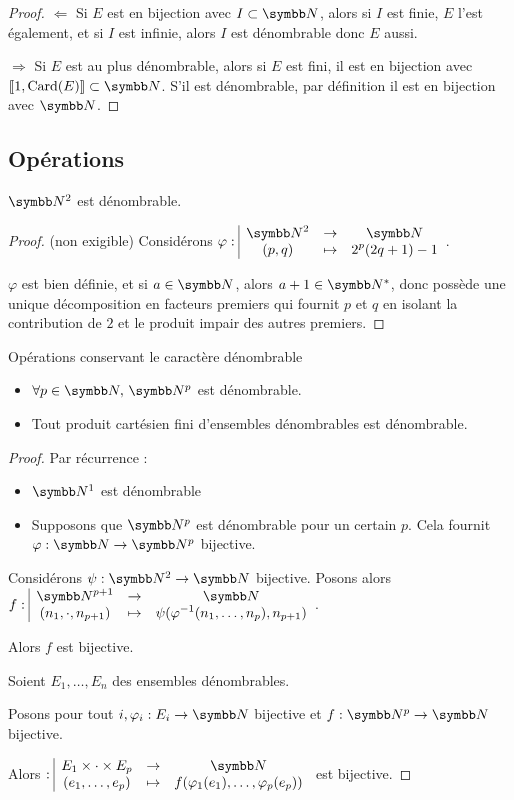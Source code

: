 \begin{proof}
    $\Leftarrow$ Si $E$ est en bijection avec $I \subset \N$, alors si $I$ est finie, 
    $E$ l'est également, et si $I$ est infinie, alors $I$ est dénombrable donc $E$ aussi.

    $\Rightarrow$ Si $E$ est au plus dénombrable, alors si $E$ est fini, il est en bijection 
    avec $\ninter 1 {\text{Card}(E)} \subset \N$.
    S'il est dénombrable, par définition il est en bijection avec $\N$.
\end{proof}

\subsection{Opérations}

\begin{theoreme}{}{}
    $\N^2$ est dénombrable.
\end{theoreme}

\begin{proof} (non exigible)
    Considérons $\fonction \varphi {\N^2} \N {(p, q)}{2^p (2q + 1) - 1}$.

    $\varphi$ est bien définie, et si $a \in \N$, alors $a + 1 \in \N^*$, donc possède 
    une unique décomposition en facteurs premiers qui fournit $p$ et $q$ en isolant 
    la contribution de $2$ et le produit impair des autres premiers. 
\end{proof}

\begin{proposition}{Opérations conservant le caractère dénombrable}{}
    \begin{itemize}
        \item $\forall p \in \N, \, \N^p$ est dénombrable.
        \item Tout produit cartésien fini d'ensembles dénombrables est dénombrable.
    \end{itemize}
\end{proposition}


\begin{proof}
    Par récurrence : 
    \begin{itemize}
        \item $\N^1$ est dénombrable 
        \item Supposons que $\N^p$ est dénombrable pour un certain $p$. Cela fournit $\varphi : \N \to \N^p$ bijective. 
    \end{itemize}

    Considérons $\psi : \N^2 \to \N$ bijective. Posons alors $\fonction f {\N^{p + 1}} \N {(n_1, \cdot, n_{p + 1})} {\psi(\varphi^{-1}(n_1, \ldots, n_p), n_{p + 1})}$.

    Alors $f$ est bijective. 

    \lvspace Soient $E_1, \ldots, E_n$ des ensembles dénombrables.

    Posons pour tout $i, \varphi_i : E_i \to \N$ bijective et $f : \N^p \to \N$ bijective.

    Alors $\fonction{}{E_1 \times \cdot \times E_p} \N {(e_1, \ldots, e_p)} {f(\varphi_1(e_1), \ldots, \varphi_p(e_p))}$ est bijective.
\end{proof}

